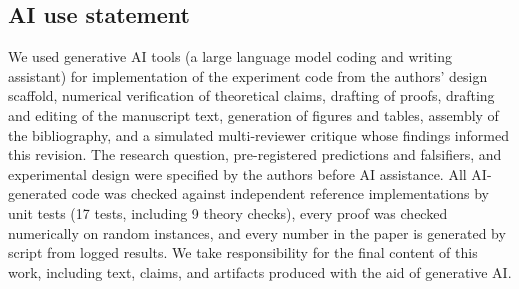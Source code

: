\documentclass[twoside]{article}
\theoremstyle{definition}
\theoremstyle{remark}
\begin{document}
\subsection*{AI use statement}
We used generative AI tools (a large language model coding and writing assistant) for implementation of the experiment code from the authors' design scaffold, numerical verification of theoretical claims, drafting of proofs, drafting and editing of the manuscript text, generation of figures and tables, assembly of the bibliography, and a simulated multi-reviewer critique whose findings informed this revision. The research question, pre-registered predictions and falsifiers, and experimental design were specified by the authors before AI assistance. All AI-generated code was checked against independent reference implementations by unit tests (17 tests, including 9 theory checks), every proof was checked numerically on random instances, and every number in the paper is generated by script from logged results. We take responsibility for the final content of this work, including text, claims, and artifacts produced with the aid of generative AI.



\clearpage


\clearpage
\appendix
\thispagestyle{empty}
\onecolumn
{}

\end{document}
